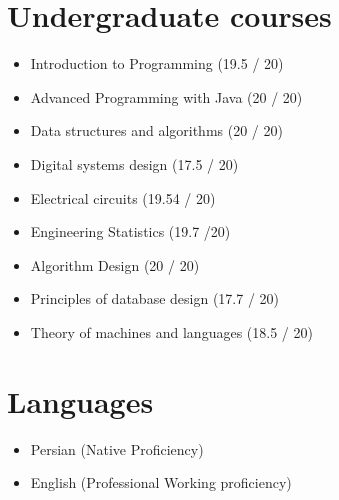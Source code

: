 \documentclass[11pt,a4paper,sans]{moderncv}
\begin{document}
\section{ Undergraduate courses}
\begin{itemize}
    \item Introduction to Programming (19.5 / 20)
    \item Advanced Programming with Java (20 / 20)
    \item Data structures and algorithms (20 / 20)
    \item Digital systems design (17.5 / 20)
    \item Electrical circuits (19.54 / 20)
    \item Engineering Statistics (19.7 /20)
    \item Algorithm Design (20 / 20)
    \item Principles of database design (17.7 / 20)
    \item Theory of machines and languages (18.5 / 20)
\end{itemize}
\section{ Languages}
\begin{itemize}
    \item Persian (Native Proficiency)
    \item English (Professional Working proficiency)
\end{itemize}
\end{document}
